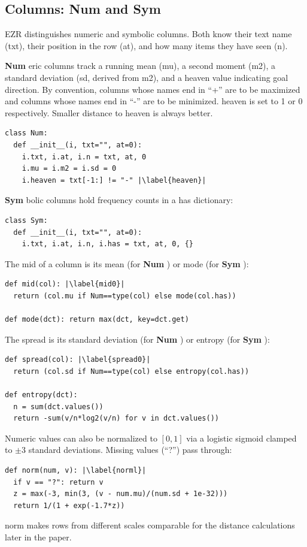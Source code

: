 \documentclass[AMA,STIX2COL]{WileyNJDv5}
\newcommand{\IT}{{\sffamily EZR}}
\newcommand{\cls}[1]{%
  \setlength{\fboxsep}{1.5pt}%
  \colorbox{clsbg}{\sffamily\bfseries{#1}}%
}
\begin{document}
\subsection{Columns: \cls{Num} and \cls{Sym}}

\IT{} distinguishes numeric and symbolic columns. Both know
their text name (\textsf{txt}), their position in the row
(\textsf{at}), and how many items they have seen (\textsf{n}).

\cls{Num}eric columns track a running mean (\textsf{mu}), a
second moment (\textsf{m2}), a standard deviation (\textsf{sd},
derived from \textsf{m2}), and a \textsf{heaven} value
indicating goal direction. By convention, columns whose names
end in ``+'' are to be maximized and columns whose names end in
``-'' are to be minimized. \textsf{heaven} is set to 1 or 0
respectively. Smaller distance to \textsf{heaven} is always
better.
\begin{lstlisting}
class Num:
  def __init__(i, txt="", at=0):
    i.txt, i.at, i.n = txt, at, 0
    i.mu = i.m2 = i.sd = 0
    i.heaven = txt[-1:] != "-" |\label{heaven}|
\end{lstlisting}
\cls{Sym}bolic columns hold frequency counts in a \textsf{has}
dictionary:
\begin{lstlisting}
class Sym:
  def __init__(i, txt="", at=0):
    i.txt, i.at, i.n, i.has = txt, at, 0, {}
\end{lstlisting}
The \textsf{mid} of a column is its mean (for \cls{Num}) or
mode (for \cls{Sym}):
\begin{lstlisting}
def mid(col): |\label{mid0}|
  return (col.mu if Num==type(col) else mode(col.has))

def mode(dct): return max(dct, key=dct.get)
\end{lstlisting}
The \textsf{spread} is its standard deviation (for \cls{Num})
or entropy (for \cls{Sym}):
\begin{lstlisting}
def spread(col): |\label{spread0}|
  return (col.sd if Num==type(col) else entropy(col.has))

def entropy(dct):
  n = sum(dct.values())
  return -sum(v/n*log2(v/n) for v in dct.values())
\end{lstlisting}
Numeric values can also be normalized to $[0,1]$ via a logistic
sigmoid clamped to $\pm3$ standard deviations. Missing values
(``?'') pass through:
\begin{lstlisting}
def norm(num, v): |\label{norml}|
  if v == "?": return v
  z = max(-3, min(3, (v - num.mu)/(num.sd + 1e-32)))
  return 1/(1 + exp(-1.7*z))
\end{lstlisting}
\textsf{norm} makes rows from different scales comparable for
the distance calculations later in the paper.
\end{document}
